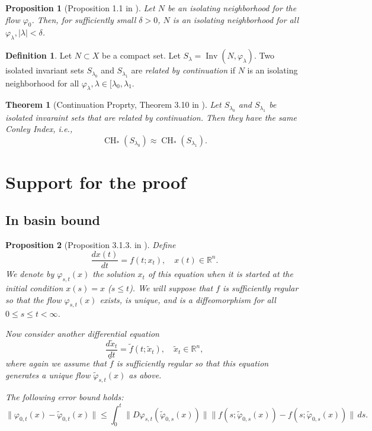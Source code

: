 \documentclass{article}
\newtheorem{theorem}{Theorem}
\newtheorem{proposition}{Proposition}
\theoremstyle{definition}
\newtheorem{definition}{Definition}
\theoremstyle{remark}
\newcommand{\inv}{\operatorname{Inv}}
\newcounter{ct}
\begin{document}
\begin{proposition}[Proposition 1.1 in \citep{mischaikow1999cit}]
Let $N$ be an isolating neighborhood for the flow $\varphi_0$. Then, for sufficiently small $\delta>0$, $N$ is an isolating neighborhood for all $\varphi_\lambda, |\lambda|<\delta$.
\end{proposition}

\begin{definition}
Let $N\subset X$ be a compact set. 
Let $S_\lambda = \inv(N,\varphi_\lambda).$
Two isolated invariant sets $S_{\lambda_0}$ and $S_{\lambda_1}$ are \emph{related by continuation} if $N$ is an isolating neighborhood for all $\varphi_\lambda, \lambda\in[\lambda_0,\lambda_1$.
\end{definition}

\begin{theorem}[Continuation Proprty, Theorem 3.10 in \citep{mischaikow1999cit}]
Let $S_{\lambda_0}$ and $S_{\lambda_1}$ be isolated invaraint sets that are related by continuation. 
Then they have the same Conley Index, i.e.,
\[
\operatorname{CH}_*(S_{\lambda_0})\approx \operatorname{CH}_*(S_{\lambda_1}).
\]
\end{theorem}

\section{Support for the proof}
\subsection{In basin bound}\label{sec:313}
\begin{proposition}[Proposition 3.1.3. in \citep{vanhandel2007filtering}]\label{prop:313}
Define 
\[
\frac{d x(t)}{d t} = f(t; x_t), \quad x(t) \in \mathbb{R}^n.
\]
We denote by $\varphi_{s,t}(x)$ the solution $x_t$ of this equation when it is started at the initial condition $x(s) = x$ ($s \leq t$). We will suppose that $f$ is sufficiently regular so that the flow $\varphi_{s,t}(x)$ exists, is unique, and is a diffeomorphism for all $0 \leq s \leq t < \infty$.

Now consider another differential equation 
\[
\frac{d \tilde{x}_t}{d t} = \tilde{f}(t; \tilde{x}_t), \quad \tilde{x}_t \in \mathbb{R}^n,
\]
where again we assume that $\tilde{f}$ is sufficiently regular so that this equation generates a unique flow $\tilde{\varphi}_{s,t}(x)$ as above.


The following error bound holds:
\[
\|\varphi_{0,t}(x) - \tilde{\varphi}_{0,t}(x)\| \leq \int_0^t \|D\varphi_{s,t}(\tilde{\varphi}_{0,s}(x))\| \|f(s; \tilde{\varphi}_{0,s}(x)) - f(s; \tilde{\varphi}_{0,s}(x))\| \, ds.
\]
\end{proposition}
\end{document}
